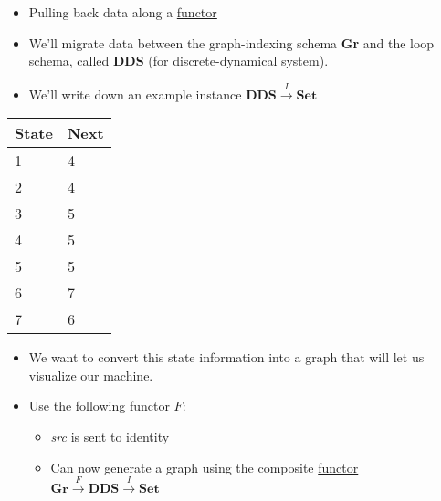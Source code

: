 \begin{itemize}
    \item  Pulling back data along a \href{doc/1 math/Seven Sketches in Compositionality/Chapter 3: Databases/3 Functors, natural transformations, and databases/2 Functors/1 Functor}{functor}
    \item We'll migrate data between the graph-indexing schema \textbf{Gr} and the loop schema, called \textbf{DDS} (for discrete-dynamical system).
    \item We'll write down an example instance $\mathbf{DDS}\xrightarrow{I}\mathbf{Set}$
  \end{itemize}

  \begin{minipage}{0.48\textwidth}

    \begin{tabular}{|l|l|}
      \hline
      State & Next \\ \hline
      1     & 4    \\ \hline
      2     & 4    \\ \hline
      3     & 5    \\ \hline
      4     & 5    \\ \hline
      5     & 5    \\ \hline
      6     & 7    \\ \hline
      7     & 6    \\ \hline
    \end{tabular}
  \end{minipage}

  \begin{itemize}
    \item  We want to convert this state information into a graph that will let us visualize our machine.
    \item Use the following \href{doc/1 math/Seven Sketches in Compositionality/Chapter 3: Databases/3 Functors, natural transformations, and databases/2 Functors/1 Functor}{functor} $F$: 
          \begin{itemize}
            \item \emph{src} is sent to identity
            \item Can now generate a graph using the composite \href{doc/1 math/Seven Sketches in Compositionality/Chapter 3: Databases/3 Functors, natural transformations, and databases/2 Functors/1 Functor}{functor} $\mathbf{Gr}\xrightarrow{F}\mathbf{DDS}\xrightarrow{I}\mathbf{Set}$
          \end{itemize}
  \end{itemize}

